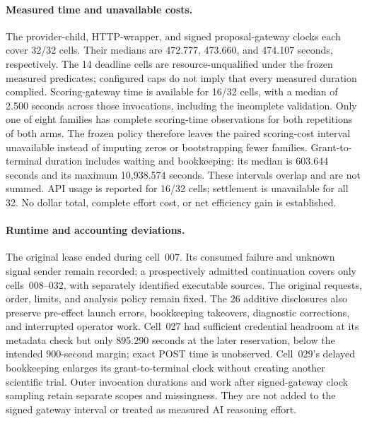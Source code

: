 \paragraph{Measured time and unavailable costs.}
The provider-child, HTTP-wrapper, and signed proposal-gateway clocks each cover
32/32 cells. Their medians are 472.777, 473.660, and 474.107 seconds,
respectively. The 14 deadline cells are resource-unqualified under the frozen
measured predicates; configured caps do not imply that every measured duration
complied. Scoring-gateway time is available for 16/32 cells, with a median of
2.500 seconds across those invocations, including the incomplete validation.
Only one of eight families has complete scoring-time observations for both
repetitions of both arms. The frozen policy therefore leaves the paired
scoring-cost interval unavailable instead of imputing zeros or bootstrapping
fewer families. Grant-to-terminal duration includes waiting and bookkeeping:
its median is 603.644 seconds and its maximum 10,938.574 seconds. These intervals
overlap and are not summed. API usage is reported for 16/32 cells; settlement
is unavailable for all 32. No dollar total, complete effort cost, or net
efficiency gain is established.

\paragraph{Runtime and accounting deviations.}
The original lease ended during cell~007. Its consumed failure and unknown
signal sender remain recorded; a prospectively admitted continuation covers
only cells~008--032, with separately identified executable sources. The original
requests, order, limits, and analysis policy remain fixed. The 26 additive
disclosures also preserve pre-effect launch errors, bookkeeping takeovers,
diagnostic corrections, and interrupted operator work. Cell~027 had sufficient
credential headroom at its metadata check but only 895.290 seconds at the
later reservation, below the intended 900-second margin; exact POST time is
unobserved. Cell~029's delayed bookkeeping enlarges its grant-to-terminal clock
without creating another scientific trial. Outer invocation durations and
work after signed-gateway clock sampling retain separate scopes and missingness. They are not added
to the signed gateway interval or treated as measured AI reasoning effort.

